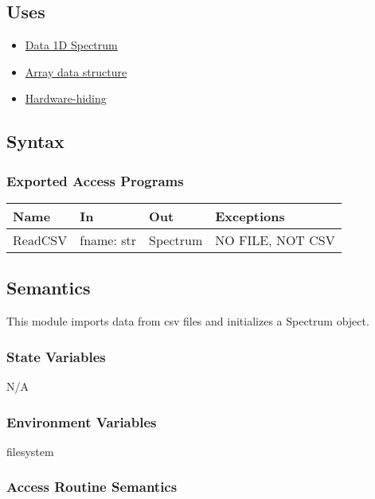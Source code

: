 \documentclass[12pt, titlepage]{article}
\begin{document}
\subsection{Uses}
\begin{itemize}
\item \hyperref[Mod:Spectrum]{Data 1D Spectrum}
\item \hyperref[Mod:Array]{Array data structure}
\item \hyperref[Mod:HH]{Hardware-hiding}
\end{itemize}

\subsection{Syntax}

\subsubsection{Exported Access Programs}

\begin{center}
\begin{tabular}{p{2cm} p{4cm} p{4cm} p{5cm}}
\hline
\textbf{Name} & \textbf{In} & \textbf{Out} & \textbf{Exceptions} \\
\hline
ReadCSV & fname: str & Spectrum & NO FILE, NOT CSV\\
\hline
\end{tabular}
\end{center}

\subsection{Semantics}
This module imports data from csv files and initializes a Spectrum object.

\subsubsection{State Variables}
N/A

\subsubsection{Environment Variables}
filesystem

\subsubsection{Access Routine Semantics}
\end{document}
